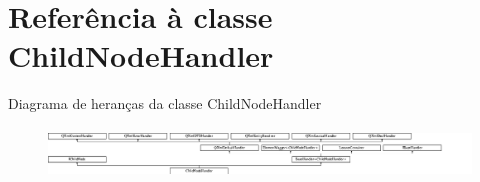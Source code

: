 \hypertarget{class_child_node_handler}{\section{Referência à classe Child\-Node\-Handler}
\label{class_child_node_handler}
}
Diagrama de heranças da classe Child\-Node\-Handler\begin{figure}[H]
\begin{center}
\leavevmode
\includegraphics[height=1.355932cm]{class_child_node_handler}
\end{center}
\end{figure}
